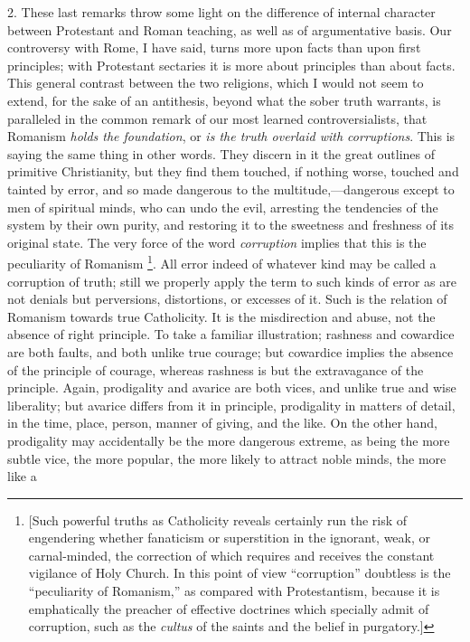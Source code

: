 2. These last remarks throw some light on the difference of
internal character between Protestant and Roman teaching, as well as
of argumentative basis. Our controversy with Rome, I have said, turns
more upon facts than upon first principles; with Protestant sectaries
it is more about principles than about facts. This general contrast
between the two religions, which I would not seem to extend, for the
sake of an antithesis, beyond what the sober truth warrants, is
paralleled in the common remark of our most learned controversialists,
that Romanism \emph{holds the foundation}, or \emph{is the truth overlaid
with corruptions}. This is saying the same thing in other words.
They discern in it the great outlines of primitive Christianity, but
they find them touched, if nothing worse, touched and tainted by
error, and so made dangerous to the multitude,—dangerous except to
men of spiritual minds, who can undo the evil, arresting the
tendencies of the system by their own purity, and restoring it to the
sweetness and freshness of its original state. The very force of the
word \emph{corruption} implies that this is the peculiarity of
Romanism \footnote{[Such powerful truths as Catholicity reveals
certainly run the risk of engendering whether fanaticism or
superstition in the ignorant, weak, or carnal-minded, the correction
of which requires and receives the constant vigilance of Holy Church.
In this point of view ``corruption'' doubtless is the ``peculiarity of Romanism,'' as compared with Protestantism, because
it is emphatically the preacher of effective doctrines which specially
admit of corruption, such as the \emph{cultus} of the saints and the
belief in purgatory.]}. All error
indeed of whatever kind may be called a corruption of truth; still we
properly apply the term to such kinds of error as are not denials but
perversions, distortions, or excesses of it. Such is the relation of
Romanism towards true Catholicity. It is the misdirection and
abuse, not the absence of right principle. To take a familiar
illustration; rashness and cowardice are both faults, and both unlike
true courage; but cowardice implies the absence of the principle of
courage, whereas rashness is but the extravagance of the principle.
Again, prodigality and avarice are both vices, and unlike true and
wise liberality; but avarice differs from it in principle, prodigality
in matters of detail, in the time, place, person, manner of giving,
and the like. On the other hand, prodigality may accidentally be the
more dangerous extreme, as being the more subtle vice, the more
popular, the more likely to attract noble minds, the more like a

